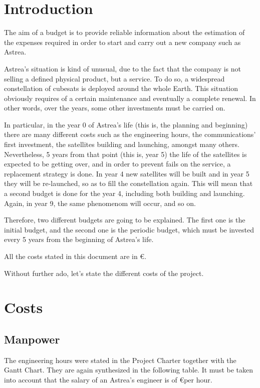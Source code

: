 \chapter{Introduction}
The aim of a budget is to provide reliable information about the estimation of the expenses required in order to start and carry out a new company such as Astrea.

Astrea's situation is kind of unusual, due to the fact that the company is not selling a defined physical product, but a service. To do so, a widespread constellation of cubesats is deployed around the whole Earth. This situation obviously requires of a certain maintenance and eventually a complete renewal. In other words, over the years, some other investments must be carried on. 

In particular, in the year 0 of Astrea's life (this is, the planning and beginning) there are many different costs such as the engineering hours, the communications' first investment, the satellites building and launching, amongst many others. Nevertheless, 5 years from that point (this is, year 5) the life of the satellites is expected to be getting over, and in order to prevent fails on the service, a replacement strategy is done. In year 4 new satellites will be built and in year 5 they will be re-launched, so as to fill the constellation again. This will mean that a second budget is done for the year 4, including both building and launching. Again, in year 9, the same phenomenom will occur, and so on. 

Therefore, two different budgets are going to be explained. The first one is the initial budget, and the second one is the periodic budget, which must be invested every 5 years from the beginning of Astrea's life. 

All the costs stated in this document are in \euro. 

Without further ado, let's state the different costs of the project.


\chapter{Costs}
\section{Manpower}
The engineering hours were stated in the Project Charter together with the Gantt Chart. They are again synthesized in the following table. It must be taken into account that the salary of an Astrea's engineer is of \euro  per hour. 

